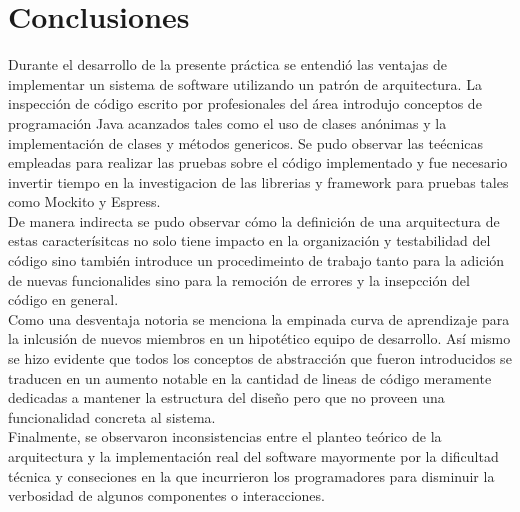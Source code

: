 
\chapter{Conclusiones} %

\label{Chapter6} %


Durante el desarrollo de la presente práctica se entendió las ventajas de implementar un sistema de software utilizando un patrón de arquitectura. La inspección de código escrito por profesionales del área introdujo conceptos de programación Java acanzados tales como el uso de clases anónimas y la implementación de clases y métodos genericos. Se pudo observar las teécnicas empleadas para realizar las pruebas sobre el código implementado y fue necesario invertir tiempo en la investigacion de las librerias y framework para pruebas tales como Mockito y Espress.\\
De manera indirecta se pudo observar cómo la definición de una arquitectura de estas caracterísitcas no solo tiene impacto en la organización y testabilidad del código sino también introduce un procedimeinto de trabajo tanto para la adición de nuevas funcionalides sino para la remoción de errores y la insepcción del código en general.\\
Como una desventaja notoria se menciona la empinada curva de aprendizaje para la inlcusión de nuevos miembros en un hipotético equipo de desarrollo. Así mismo se hizo evidente que todos los conceptos de abstracción que fueron introducidos se traducen en un aumento notable en la cantidad de lineas de código meramente dedicadas a mantener la estructura del diseño pero que no proveen una funcionalidad concreta al sistema.\\
Finalmente, se observaron inconsistencias entre el planteo teórico de la arquitectura y la implementación real del software mayormente por la dificultad técnica y conseciones en la que incurrieron los programadores para disminuir la verbosidad de algunos componentes o interacciones.
